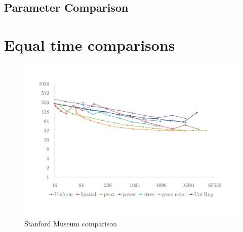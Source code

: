 \subsection{Parameter Comparison}



\label{ch:ev:photontree}

\label{ch:ev:cdftree}


\label{ch:ev:photonsampling}


\label{ch:ev:uniformfloor}


\section{Equal time comparisons}

\begin{figure}
    \centering
    \includegraphics[width=1\textwidth]{figures/plots/SM_all_mse_report.pdf}
    \caption{Stanford Museum comparison}
    \label{fig:gasfdgds}
\end{figure}

